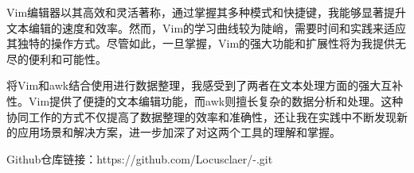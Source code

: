\documentclass[UTF8,a4paper]{ctexart}
\begin{document}
\begin{sloppypar}
	Vim编辑器以其高效和灵活著称，通过掌握其多种模式和快捷键，我能够显著提升文本编辑的速度和效率。然而，Vim的学习曲线较为陡峭，需要时间和实践来适应其独特的操作方式。尽管如此，一旦掌握，Vim的强大功能和扩展性将为我提供无尽的便利和可能性。
	
	将Vim和awk结合使用进行数据整理，我感受到了两者在文本处理方面的强大互补性。Vim提供了便捷的文本编辑功能，而awk则擅长复杂的数据分析和处理。这种协同工作的方式不仅提高了数据整理的效率和准确性，还让我在实践中不断发现新的应用场景和解决方案，进一步加深了对这两个工具的理解和掌握。
	
	Github仓库链接：https://github.com/Locusclaer/-.git
	
\end{sloppypar}
\end{document}
